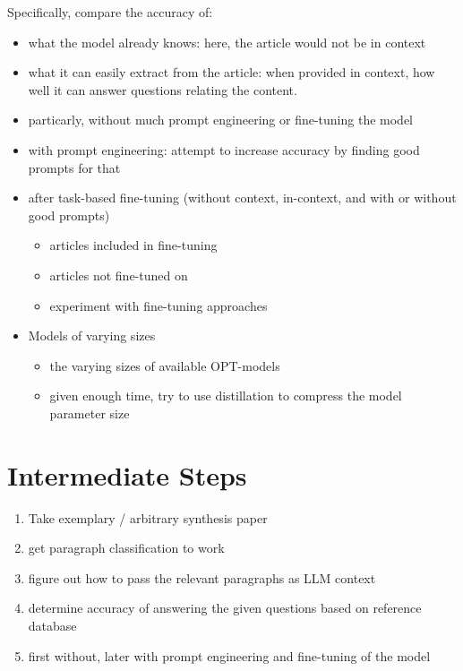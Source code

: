\documentclass[a4paper,12pt]{article}
\begin{document}
Specifically, compare the accuracy of:
\begin{itemize}
    \item what the model already knows: here, the article would not be in context
    \item what it can easily extract from the article: when provided in
        context, how well it can answer questions relating the content.
    \item particarly, without much prompt engineering or fine-tuning the model
    \item with prompt engineering: attempt to increase accuracy by finding good prompts for that
    \item after task-based fine-tuning (without context, in-context, and with or without good prompts)
    \begin{itemize}
        \item articles included in fine-tuning
        \item articles not fine-tuned on
        \item experiment with fine-tuning approaches
    \end{itemize}
    \item Models of varying sizes
    \begin{itemize}
        \item the varying sizes of available OPT-models \cite{zhang_opt_2022}
        \item given enough time, try to use distillation \cite{sun_patient_2019} to compress the model parameter size
    \end{itemize}
\end{itemize}


\section{Intermediate Steps}

\begin{enumerate}
    \item Take exemplary / arbitrary synthesis paper
    \item get paragraph classification to work
    \item figure out how to pass the relevant paragraphs as LLM context
    \item determine accuracy of answering the given questions based on reference database
    \item first without, later with prompt engineering and fine-tuning of the model
\end{enumerate}
\end{document}
